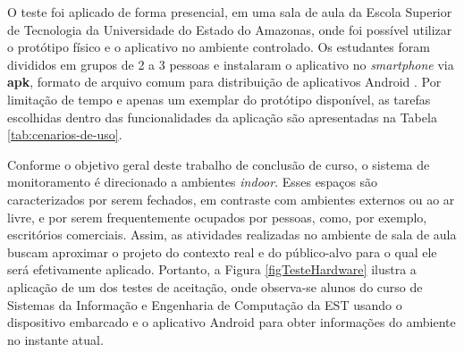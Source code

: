 O teste foi aplicado de forma presencial, em uma sala de aula da Escola Superior de Tecnologia da Universidade do Estado do Amazonas, onde foi possível utilizar o protótipo físico
e o aplicativo no ambiente controlado. Os estudantes foram divididos em grupos de 2 a 3 pessoas e instalaram o 
aplicativo no \textit{smartphone} via \textbf{apk}, formato de arquivo comum para distribuição de aplicativos Android \cite{android-developers}. Por limitação de tempo e apenas um exemplar do protótipo disponível, as 
tarefas escolhidas dentro das funcionalidades da aplicação são apresentadas na Tabela \ref{tab:cenarios-de-uso}. 

Conforme o objetivo geral deste trabalho de conclusão de curso, o sistema de monitoramento é direcionado a ambientes \textit{indoor}. Esses espaços são 
caracterizados por serem fechados, em contraste com ambientes externos ou ao ar livre, e por serem frequentemente ocupados por pessoas, como, por exemplo, escritórios comerciais. Assim, as atividades realizadas no ambiente de sala de aula 
buscam aproximar o projeto do contexto real e do público-alvo para o qual ele será efetivamente aplicado. Portanto, a Figura \ref{figTesteHardware} ilustra a aplicação de um dos testes 
de aceitação, onde observa-se alunos do curso de Sistemas da Informação e Engenharia de Computação da EST usando o dispositivo embarcado e o aplicativo Android
para obter informações do ambiente no instante atual.

